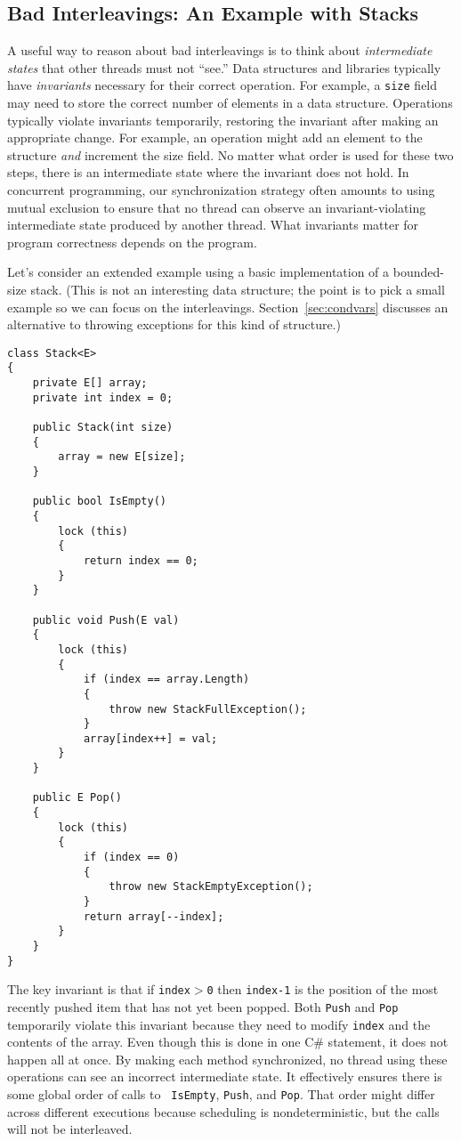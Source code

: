 \documentclass[10pt]{article}
\begin{document}
\subsection{Bad Interleavings: An Example with Stacks}
\label{sec:interleavings}

A useful way to reason about bad interleavings is to think about
\emph{intermediate states} that other threads must not ``see.''  Data
structures and libraries typically have \emph{invariants} necessary
for their correct operation.  For example, a {\tt size} field may need
to store the correct number of elements in a data structure.
Operations typically violate invariants temporarily, restoring the
invariant after making an appropriate change.  For example, an
operation might add an element to the structure \emph{and} increment
the size field.  No matter what order is used for these two steps,
there is an intermediate state where the invariant does not hold.  In
concurrent programming, our synchronization strategy often amounts to
using mutual exclusion to ensure that no thread can observe an
invariant-violating intermediate state produced by another thread.
What invariants matter for program correctness depends on the program.

Let's consider an extended example using a basic implementation of a
bounded-size stack.  (This is not an interesting data structure; the
point is to pick a small example so we can focus on the interleavings.
Section~\ref{sec:condvars} discusses an alternative to throwing
exceptions for this kind of structure.)
\begin{verbatim}
class Stack<E>
{
    private E[] array;
    private int index = 0;

    public Stack(int size)
    {
        array = new E[size];
    }

    public bool IsEmpty()
    {
        lock (this)
        {
            return index == 0;
        }
    }

    public void Push(E val)
    {
        lock (this)
        {
            if (index == array.Length)
            {
                throw new StackFullException();
            }
            array[index++] = val;
        }
    }

    public E Pop()
    {
        lock (this)
        {
            if (index == 0)
            {
                throw new StackEmptyException();
            }
            return array[--index];
        }
    }
}
\end{verbatim}
The key invariant is that if {\tt index$>$0} then {\tt index-1} is the
position of the most recently pushed item that has not yet been
popped.  Both {\tt Push} and {\tt Pop} temporarily violate this
invariant because they need to modify {\tt index} and the contents of
the array.  Even though this is done in one C\# statement, it does
not happen all at once.  By making each method synchronized, no thread
using these operations can see an incorrect intermediate state.  It
effectively ensures there is some global order of calls to {\tt
  IsEmpty}, {\tt Push}, and {\tt Pop}.  That order might differ across
different executions because scheduling is nondeterministic, but the
calls will not be interleaved.
\end{document}
